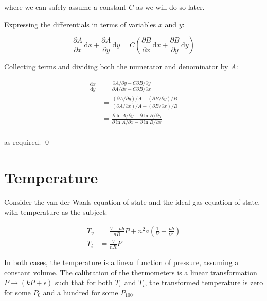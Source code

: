 \documentclass[12pt]{article}
\begin{document}
where we can safely assume a constant $C$ as we will do so later.

Expressing the differentials in terms of variables $x$ and $y$:

\begin{equation}
    \frac{\partial A}{\partial x} \, \mathrm{d}x + \frac{\partial A}{\partial y} \, \mathrm{d}y = C \left( \frac{\partial B}{\partial x} \, \mathrm{d}x + \frac{\partial B}{\partial y} \, \mathrm{d}y \right)
\end{equation}

Collecting terms and dividing both the numerator and denominator by $A$:

\begin{equation}
\begin{split}
    \frac{\mathrm{d}x}{\mathrm{d}y} &= \frac{\partial A/\partial y - C \partial B/\partial y}{\partial A/\partial x - C \partial B/\partial x} \\
    &= \frac{(\partial A/\partial y)/A - (\partial B/\partial y)/B}{(\partial A/\partial x)/A - (\partial B/\partial x)/B} \\
    &= \frac{\partial \ln{A}/\partial y - \partial \ln{B}/\partial y}{\partial \ln{A}/\partial x - \partial \ln{B}/\partial x} \\
\end{split}
\end{equation}

as required.
\qed


\pagebreak
\section*{Temperature}


Consider the van der Waals equation of state and the ideal gas equation of state, with temperature as the subject:

\begin{equation}
    \begin{split}
        T_{v} &= \frac{V - nb}{nR} P + n^{2}a \left( \frac{1}{V} - \frac{nb}{V^{2}} \right) \\
        T_{i} &= \frac{V}{nR} P
    \end{split}
\end{equation}

In both cases, the temperature is a linear function of pressure, assuming a constant volume. The calibration of the thermometers is a linear transformation $P \to (kP + \epsilon)$ such that for both $T_{v}$ and $T_{i}$, the transformed temperature is zero for some $P_{0}$ and a hundred for some $P_{100}$.
\end{document}
